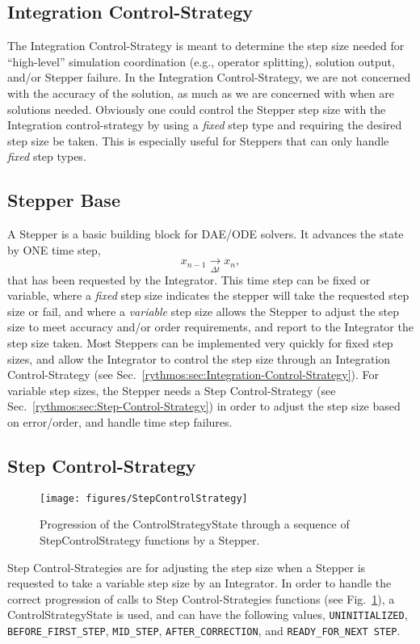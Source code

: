 \subsection{Integration Control-Strategy\label{rythmos:sec:Integration-Control-Strategy}}

The Integration Control-Strategy is meant to determine the step size
needed for ``high-level'' simulation coordination (e.g., operator
splitting), solution output, and/or Stepper failure. In the Integration
Control-Strategy, we are not concerned with the accuracy of the solution,
as much as we are concerned with when are solutions needed. Obviously
one could control the Stepper step size with the Integration control-strategy
by using a \emph{fixed} step type and requiring the desired step size
be taken. This is especially useful for Steppers that can only handle
\emph{fixed} step types.

\subsection{Stepper Base}

A Stepper is a basic building block for DAE/ODE solvers. It advances
the state by ONE time step,
\[
x_{n-1}\underset{\Delta t}{\longrightarrow}x_{n},
\]
that has been requested by the Integrator. This time step can be fixed
or variable, where a \emph{fixed }step size indicates the stepper
will take the requested step size or fail, and where a \emph{variable}
step size allows the Stepper to adjust the step size to meet accuracy
and/or order requirements, and report to the Integrator the step size
taken. Most Steppers can be implemented very quickly for fixed step
sizes, and allow the Integrator to control the step size through an
Integration Control-Strategy (see Sec.~\ref{rythmos:sec:Integration-Control-Strategy}).
For variable step sizes, the Stepper needs a Step Control-Strategy
(see Sec.~\ref{rythmos:sec:Step-Control-Strategy}) in order to adjust
the step size based on error/order, and handle time step failures.

\subsection{Step Control-Strategy\label{rythmos:sec:Step-Control-Strategy}}

\begin{figure}
\centering{}\texttt{[image: figures/StepControlStrategy]}\caption{Progression of the ControlStrategyState through a sequence of StepControlStrategy
functions by a Stepper.\label{rythmos:fig:StepControlStateProgression}}
\end{figure}
Step Control-Strategies are for adjusting the step size when a Stepper
is requested to take a variable step size by an Integrator. In order
to handle the correct progression of calls to Step Control-Strategies
functions (see Fig.~\ref{rythmos:fig:StepControlStateProgression}),
a ControlStrategyState is used, and can have the following values,
\texttt{\textsc{UNINITIALIZED}}, \texttt{\textsc{BEFORE\_FIRST\_STEP}},
\texttt{\textsc{MID\_STEP}}, \texttt{\textsc{AFTER\_CORRECTION}},
and \texttt{\textsc{READY\_FOR\_NEXT STEP}}.

